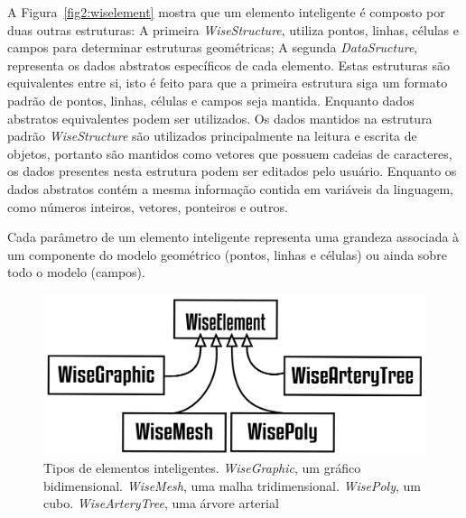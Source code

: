 A Figura~\ref{fig2:wiselement} mostra que um elemento inteligente é composto por duas outras estruturas: A primeira \textit{WiseStructure}, utiliza pontos, linhas, células e campos para determinar estruturas geométricas; A segunda \textit{DataSructure}, representa os dados abstratos específicos de cada elemento. Estas estruturas são equivalentes entre si, isto é feito para que a primeira estrutura siga um formato padrão de pontos, linhas, células e campos seja mantida. Enquanto dados abstratos equivalentes podem ser utilizados. Os dados mantidos na estrutura padrão \textit{WiseStructure} são utilizados principalmente na leitura e escrita de objetos, portanto são mantidos como vetores que possuem cadeias de caracteres, os dados presentes nesta estrutura podem ser editados pelo usuário. Enquanto os dados abstratos contém a mesma informação contida em variáveis da linguagem, como números inteiros, vetores, ponteiros e outros.

Cada parâmetro de um elemento inteligente representa uma grandeza associada à um componente do modelo geométrico (pontos,  linhas e células) ou ainda sobre todo o modelo (campos). 

\begin{figure}[!htbp]
	\centering
	\includegraphics[width=\textwidth]{Figures/WiseElements@16x.png}
	\caption{Tipos de elementos inteligentes. \textit{WiseGraphic}, um gráfico bidimensional. \textit{WiseMesh}, uma malha tridimensional. \textit{WisePoly}, um cubo. \textit{WiseArteryTree}, uma árvore arterial}
	\label{fig2:wiselements}
\end{figure}

